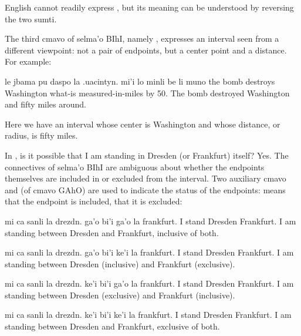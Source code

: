 English cannot readily express , but its meaning
    can be understood by reversing the two sumti.

The third cmavo of selma'o BIhI, namely , expresses
    an interval seen from a different viewpoint: not a pair of
    endpoints, but a center point and a distance. For example:
\begin{example}
le jbama pu daspo la .uacintyn.\n
\T	mi'i lo minli be li muno\n
the bomb  destroys Washington\n
\T	[center] what-is measured-in-miles by 50.\n
The bomb destroyed Washington and fifty miles around.
\end{example}

Here we have an interval whose center is Washington and
    whose distance, or radius, is fifty miles.

In , is it possible that I
    am standing in Dresden (or Frankfurt) itself? Yes. The
    connectives of selma'o BIhI are ambiguous about whether the
    endpoints themselves are included in or excluded from the
    interval. Two auxiliary cmavo  and  (of cmavo
    GAhO) are used to indicate the status of the endpoints:
     means that the endpoint is included,  that it
    is excluded:
\begin{example}
mi ca sanli la drezdn.\n
\T	ga'o bi'i ga'o la frankfurt.\n
I  stand Dresden\n
\T	[inclusive] [interval] [inclusive] Frankfurt.\n
I am standing between Dresden and Frankfurt,\n
\T	inclusive of both.
\end{example}

\begin{example}
mi ca sanli la drezdn.\n
\T	ga'o bi'i ke'i la frankfurt.\n
I  stand Dresden\n
\T	[inclusive] [interval] [exclusive] Frankfurt.\n
I am standing between Dresden (inclusive)\n
\T	and Frankfurt (exclusive).
\end{example}

\begin{example}
mi ca sanli la drezdn.\n
\T	ke'i bi'i ga'o la frankfurt.\n
I  stand Dresden\n
\T	[exclusive] [interval] [inclusive] Frankfurt.\n
I am standing between Dresden (exclusive)\n
\T	and Frankfurt (inclusive).
\end{example}

\begin{example}
mi ca sanli la drezdn.\n
\T	ke'i bi'i ke'i la frankfurt.\n
I  stand Dresden\n
\T	[exclusive] [interval] [exclusive] Frankfurt.\n
I am standing between Dresden and Frankfurt,\n
\T	exclusive of both.
\end{example}

